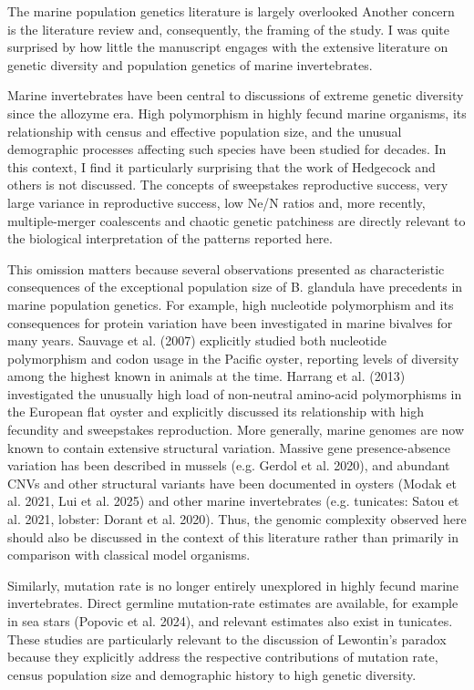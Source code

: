 \begin{point}{The marine population genetics literature is largely overlooked}
Another concern is the literature review and, consequently, the framing
of the study. I was quite surprised by how little the manuscript engages
with the extensive literature on genetic diversity and population
genetics of marine invertebrates.

Marine invertebrates have been central to discussions of extreme genetic
diversity since the allozyme era. High polymorphism in highly fecund
marine organisms, its relationship with census and effective population
size, and the unusual demographic processes affecting such species have
been studied for decades. In this context, I find it particularly
surprising that the work of Hedgecock and others is not discussed. The
concepts of sweepstakes reproductive success, very large variance in
reproductive success, low Ne/N ratios and, more recently, multiple-merger
coalescents and chaotic genetic patchiness are directly relevant to the
biological interpretation of the patterns reported here.

This omission matters because several observations presented as
characteristic consequences of the exceptional population size of B.
glandula have precedents in marine population genetics. For example, high
nucleotide polymorphism and its consequences for protein variation have
been investigated in marine bivalves for many years. Sauvage et al.
(2007) explicitly studied both nucleotide polymorphism and codon usage in
the Pacific oyster, reporting levels of diversity among the highest known
in animals at the time. Harrang et al. (2013) investigated the unusually
high load of non-neutral amino-acid polymorphisms in the European flat
oyster and explicitly discussed its relationship with high fecundity and
sweepstakes reproduction. More generally, marine genomes are now known to
contain extensive structural variation. Massive gene presence-absence
variation has been described in mussels (e.g. Gerdol et al. 2020), and
abundant CNVs and other structural variants have been documented in
oysters (Modak et al. 2021, Lui et al. 2025) and other marine
invertebrates (e.g. tunicates: Satou et al. 2021, lobster: Dorant et al.
2020). Thus, the genomic complexity observed here should also be
discussed in the context of this literature rather than primarily in
comparison with classical model organisms.

Similarly, mutation rate is no longer entirely unexplored in highly
fecund marine invertebrates. Direct germline mutation-rate estimates are
available, for example in sea stars (Popovic et al. 2024), and relevant
estimates also exist in tunicates. These studies are particularly
relevant to the discussion of Lewontin's paradox because they explicitly
address the respective contributions of mutation rate, census population
size and demographic history to high genetic diversity.


\end{point}

